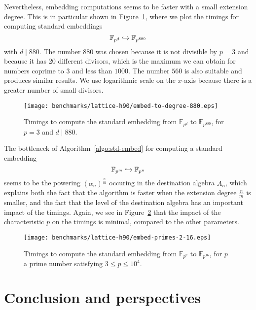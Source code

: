 Nevertheless, embedding computations seems to be faster with a small extension
degree. This is in particular shown in Figure~\ref{fig:embed-to-880}, where we
plot the timings for computing standard embeddings
\[
  \mathbb{F}_{p^d}\hookrightarrow\mathbb{F}_{p^{880}}
\]
with $d\mid880$. The number $880$ was chosen because it is not divisible by
$p=3$ and because it has 20 different divisors, which is the maximum we can
obtain for numbers coprime to $3$ and less than $1000$. The number $560$ is
also suitable and produces similar results. We use logarithmic scale on the
$x$-axis because there is a greater number of small divisors.
\begin{figure}
  \centering
  \texttt{[image: benchmarks/lattice-h90/embed-to-degree-880.eps]}
  \caption{Timings to compute the standard embedding from $\mathbb{F}_{p^d}$ to
  $\mathbb{F}_{p^{880}}$, for $p=3$ and $d\mid880$.}
  \label{fig:embed-to-880}
\end{figure}
The bottleneck of Algorithm~\ref{algo:std-embed} for computing a standard
embedding
\[
  \mathbb{F}_{p^m}\hookrightarrow\mathbb{F}_{p^{n}}
\]
seems to be the powering $(\alpha_n)^{\frac{n}{m}}$ occuring in the destination algebra
$A_n$, which explains both the fact
that the algorithm is faster when the extension degree $\frac{n}{m}$ is smaller,
and the fact that the level of the destination algebra has an important impact
of the timings.
Again, we see in Figure~\ref{fig:embed-primes} that the impact of the
characteristic $p$ on the timings is minimal, compared to the other parameters.
\begin{figure}
  \centering
  \texttt{[image: benchmarks/lattice-h90/embed-primes-2-16.eps]}
  \caption{Timings to compute the standard embedding from $\mathbb{F}_{p^2}$ to
  $\mathbb{F}_{p^{16}}$, for $p$ a prime number satisfying $3\leq p \leq 10^4$.}
  \label{fig:embed-primes}
\end{figure}

\section{Conclusion and perspectives}
\label{sec:perspectives}


